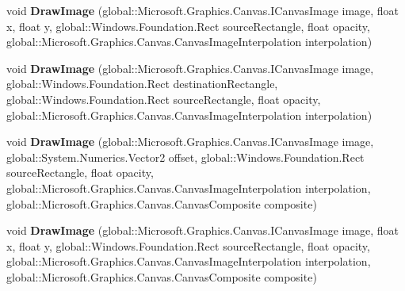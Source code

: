 \begin{DoxyCompactItemize}
\item 
\mbox{\label{class_microsoft_1_1_graphics_1_1_canvas_1_1_canvas_drawing_session_aa49faf088b25fac5a055148d09d1eff1}} 
void {\bfseries Draw\+Image} (global\+::\+Microsoft.\+Graphics.\+Canvas.\+I\+Canvas\+Image image, float x, float y, global\+::\+Windows.\+Foundation.\+Rect source\+Rectangle, float opacity, global\+::\+Microsoft.\+Graphics.\+Canvas.\+Canvas\+Image\+Interpolation interpolation)
\item 
\mbox{\label{class_microsoft_1_1_graphics_1_1_canvas_1_1_canvas_drawing_session_a3c2a089b12fc1e33bb3b5ae2635ae0fa}} 
void {\bfseries Draw\+Image} (global\+::\+Microsoft.\+Graphics.\+Canvas.\+I\+Canvas\+Image image, global\+::\+Windows.\+Foundation.\+Rect destination\+Rectangle, global\+::\+Windows.\+Foundation.\+Rect source\+Rectangle, float opacity, global\+::\+Microsoft.\+Graphics.\+Canvas.\+Canvas\+Image\+Interpolation interpolation)
\item 
\mbox{\label{class_microsoft_1_1_graphics_1_1_canvas_1_1_canvas_drawing_session_af0f0b4966926f42572dd6ea8a83e5632}} 
void {\bfseries Draw\+Image} (global\+::\+Microsoft.\+Graphics.\+Canvas.\+I\+Canvas\+Image image, global\+::\+System.\+Numerics.\+Vector2 offset, global\+::\+Windows.\+Foundation.\+Rect source\+Rectangle, float opacity, global\+::\+Microsoft.\+Graphics.\+Canvas.\+Canvas\+Image\+Interpolation interpolation, global\+::\+Microsoft.\+Graphics.\+Canvas.\+Canvas\+Composite composite)
\item 
\mbox{\label{class_microsoft_1_1_graphics_1_1_canvas_1_1_canvas_drawing_session_a9d48be4c8e49a97cd2b0188a5608a92f}} 
void {\bfseries Draw\+Image} (global\+::\+Microsoft.\+Graphics.\+Canvas.\+I\+Canvas\+Image image, float x, float y, global\+::\+Windows.\+Foundation.\+Rect source\+Rectangle, float opacity, global\+::\+Microsoft.\+Graphics.\+Canvas.\+Canvas\+Image\+Interpolation interpolation, global\+::\+Microsoft.\+Graphics.\+Canvas.\+Canvas\+Composite composite)
\item 
\mbox{\label{class_microsoft_1_1_graphics_1_1_canvas_1_1_canvas_drawing_session_a067a36d992b31189118ee74ab73c7546}} 

\end{DoxyCompactItemize}
